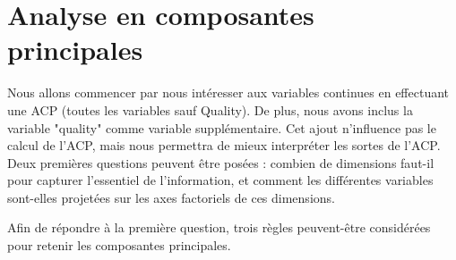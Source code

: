\documentclass[11pt,a4paper]{article}
\begin{document}
\section{Analyse en composantes principales}

Nous allons commencer par nous intéresser aux variables continues en effectuant une ACP (toutes les variables sauf Quality). De plus, nous avons inclus la variable "quality" comme variable supplémentaire. Cet ajout n'influence pas le calcul de l'ACP, mais nous permettra de mieux interpréter les sortes de l'ACP.
Deux premières questions peuvent être posées : combien de dimensions faut-il pour capturer l'essentiel de l'information, et comment les différentes variables sont-elles projetées sur les axes factoriels de ces dimensions.

Afin de répondre à la première question, trois règles peuvent-être considérées pour retenir les composantes principales.
\end{document}
